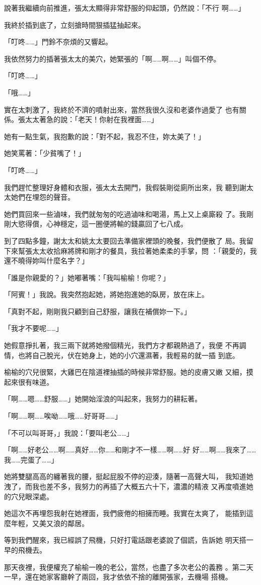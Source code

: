 說著我繼續向前推進，張太太顯得非常舒服的仰起頭，仍然說：「不行
啊……」

我終於插到底了，立刻搶時間狠插猛抽起來。

「叮咚……」門鈴不奈煩的又響起。

我依然努力的插著張太太的美穴，她緊張的「啊……啊……」叫個不停。

「叮咚……」

「哦……」

實在太刺激了，我終於不濟的噴射出來，當然我很久沒和老婆作過愛了
也有關係。張太太著急的說：「老天！你射在我裡面……」

她有一點生氣，我抱歉的說：「對不起，我忍不住，妳太美了！」

她笑罵著：「少貧嘴了！」

「叮咚……」

我們趕忙整理好身體和衣服，張太太去開門，我假裝剛從廁所出來，我
聽到謝太太她們在埋怨的聲音。

她們買回來一些滷味，我們就匆匆的吃過滷味和喝湯，馬上又上桌廝殺
了。我剛剛大慾得償，心神穩定，這一圈便將輸的錢贏回了七八成。

到了四點多鐘，謝太太和姚太太要回去準備家裡頭的晚餐，我們便散了
局。我留下來幫張太太收拾麻將牌和剛才的餐具，我拉著她柔柔的手掌，問
：「親愛的，我還不曉得妳叫什麼名字？」

「誰是你親愛的？」她嘟著嘴：「我叫榆榆！你呢？」

「阿賓！」我說。我突然抱起她，將她抱進她的臥房，放在床上。

「真對不起，剛剛我只顧到自己舒服，讓我在補償妳一下。」

「我才不要呢……」

她假意掙扎著，我三兩下就將她撥個精光，我們方才都親熱過了，我便
不再調情，也將自己脫光，伏在她身上，她的小穴還濕著，我輕易的就一插
到底。

榆榆的穴兒很緊，大雞巴在陰道裡抽插的時候非常舒服。她的皮膚又嫩
又細，摸起來很有味道。

「啊……嗯……舒服……」她開始淫浪的叫起來，我努力的耕耘著。

「啊……啊……唉呦……哦……好哥哥……」

「不可以叫哥哥，」我說：「要叫老公……」

「啊……好老公……啊……真好……你……和剛才不一樣……啊……好
好……啊……我來了……我……完蛋了……」

她將雙腿高高的纏著我的腰，挺起屁股不停的迎湊，隨著一高聲大叫，
我知道她洩了，而我也差不多，我努力的再插了大概五六十下，濃濃的精液
又再度噴進她的穴兒眼深處。

她這次不再埋怨我射在她裡面，我們疲倦的相擁而睡。我實在太爽了，
能插到這麼年輕，又美又浪的鄰居。

等到我們醒來，我已經誤了飛機，只好打電話跟老婆說了個謊，告訴她
明天搭一早的飛機去。

那天夜裡，我便權充了榆榆一晚的老公，當然，也盡了多次老公的義務
。第二天一早，還在她家客廳幹了兩回，我才依依不捨的離開張家，去機場
搭機。